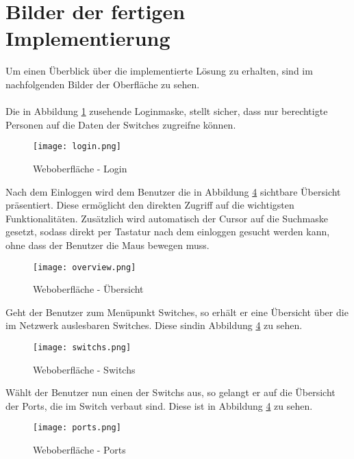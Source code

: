 \section*{Bilder der fertigen Implementierung}
\label{sec:impimgs}

Um einen Überblick über die implementierte Lösung zu erhalten, sind im nachfolgenden Bilder der Oberfläche zu sehen.\\\\
Die in Abbildung \ref{fig:login} zusehende Loginmaske, stellt sicher, dass nur berechtigte Personen auf die Daten der Switches zugreifne können.


\begin{figure}[H]
\centering
\texttt{[image: login.png]}
\caption[]{Weboberfläche - Login}
\label{fig:login}
\end{figure}

Nach dem Einloggen wird dem Benutzer die in Abbildung \ref{fig:overview} sichtbare Übersicht präsentiert.
Diese ermöglicht den direkten Zugriff auf die wichtigsten Funktionalitäten.
Zusätzlich wird automatisch der Cursor auf die Suchmaske gesetzt, sodass direkt per Tastatur nach dem einloggen gesucht werden kann, ohne dass der Benutzer die Maus bewegen muss.

\begin{figure}[H]
\centering
\texttt{[image: overview.png]}
\caption[]{Weboberfläche - Übersicht}
\label{fig:overview}
\end{figure}

Geht der Benutzer zum Menüpunkt Switches, so erhält er eine Übersicht über die im Netzwerk auslesbaren Switches.
Diese sindin Abbildung \ref{fig:overview} zu sehen.

\begin{figure}[H]
\centering
\texttt{[image: switchs.png]}
\caption[]{Weboberfläche - Switchs}
\label{fig:overview}
\end{figure}

Wählt der Benutzer nun einen der Switchs aus, so gelangt er auf die Übersicht der Ports, die im Switch verbaut sind.
Diese ist in Abbildung \ref{fig:overview} zu sehen.

\begin{figure}[H]
\centering
\texttt{[image: ports.png]}
\caption[]{Weboberfläche - Ports}
\label{fig:overview}
\end{figure}

